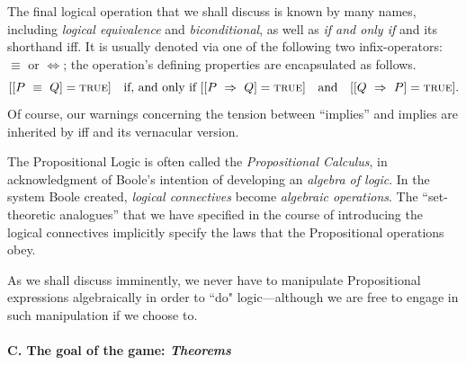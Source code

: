 \begin{itemize}
The final logical operation that we shall discuss is known by many names, including {\it logical equivalence} and {\it biconditional}, as well as {\it if and only if} and its shorthand {\sc iff}.  It is usually denoted via one of the following two infix-operators: $\equiv$ or $\Leftrightarrow$; the operation's defining properties are encapsulated as follows.
\[ 
[[P \ \equiv \ Q] = \mbox{\sc true}]  \ \ \mbox{ if, and only if }
[[P \ \Rightarrow \ Q] = \mbox{\sc true}]  \ \ \mbox{ and } \ \
[[Q \ \Rightarrow \ P] = \mbox{\sc true}].
\]
Of course, our warnings concerning the tension between ``implies'' and {\sc implies} are inherited by {\sc iff} and its vernacular version.
\end{itemize}

\medskip

The Propositional Logic is often called the {\it Propositional Calculus}, in acknowledgment of Boole's intention of developing an {\em algebra of logic}.  In the system Boole created, {\em logical connectives} become {\em algebraic operations}.  The ``set-theoretic analogues'' that we have specified in the course of introducing the logical connectives implicitly specify the laws that the Propositional operations obey.

\smallskip

As we shall discuss imminently, we never have to manipulate Propositional expressions algebraically in order to ``do" logic---although we are free to engage in such manipulation if we choose to.

\paragraph{C. The goal of the game: {\em Theorems}}

